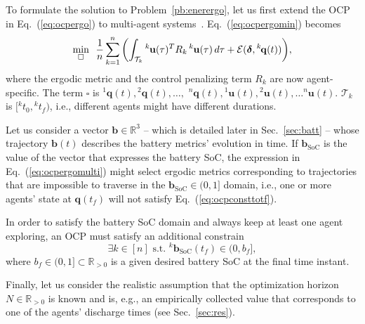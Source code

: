 \documentclass[letterpaper,10pt,conference,twoside]{IEEEtran}
\theoremstyle{definition}
\begin{document}
To formulate the solution to Problem~\ref{pb:enerergo}, let us first extend the OCP in Eq.~(\ref{eq:ocpergo}) to multi-agent systems~\cite{coffin2022multi}. Eq.~(\ref{eq:ocpergomin}) becomes
\begin{equation}\label{eq:ocpergomulti}
  \min_{\square}\,\,\,{\frac{1}{n}\sum_{k=1}^{n}\left(\int_{\mathcal{T}_k}{}^k\hspace*{-.1ex}\mathbf{u}(\tau)^TR_k\,{}^k\hspace*{-.1ex}\mathbf{u}(\tau)\,d\tau+\mathcal{E}(\boldsymbol{\delta},{}^k\hspace*{-.2ex}\mathbf{q}(t))\right)},
\end{equation}
where the ergodic metric and the control penalizing term $R_k$ are now agent-specific. The term $\square$ is ${}^1\mathbf{q}(t),{}^2\mathbf{q}(t),\dots,$ ${}^n\mathbf{q}(t),{}^1\mathbf{u}(t),{}^2\mathbf{u}(t),\dots{}^n\mathbf{u}(t)$. $\mathcal{T}_k$ is $[{}^kt_0, {}^kt_f)$, i.e., different agents might have different durations.

Let us consider a vector $\mathbf{b}\in\mathbb{R}^3$ -- which is detailed later in Sec.~\ref{sec:batt} -- whose trajectory $\mathbf{b}(t)$ describes the battery metrics' evolution in time. If $\mathbf{b}_{\text{SoC}}$ is the value of the vector that expresses the battery %
SoC, the expression in Eq.~(\ref{eq:ocpergomulti}) might select ergodic metrics corresponding to trajectories that are impossible to traverse in the $\mathbf{b}_{\text{SoC}}\in(0,1]$ domain, i.e., one or more agents' state at $\mathbf{q}(t_f)$ will not satisfy Eq.~(\ref{eq:ocpconsttotf}).

In order to satisfy the battery SoC domain and always keep at least one agent exploring, an OCP must satisfy an additional constrain
\begin{equation}\label{eq:ocpbattconst}
  \exists k\in[n]\text{ s.t. }{}^k\mathbf{b}_{\text{SoC}}(t_f)\in(0,b_f],
\end{equation}
where $b_f\in(0,1]\subset\mathbb{R}_{>0}$ is a given desired battery SoC at the final time instant.

Finally, let us consider the realistic assumption that the optimization horizon $N\in\mathbb{R}_{>0}$ is known and is,
e.g., an empirically collected value that corresponds to one of the agents' discharge times (see Sec.~\ref{sec:res}).
\end{document}
